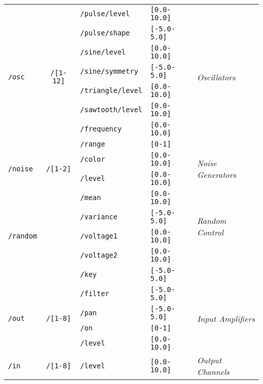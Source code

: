 \begin{table}
\begin{center}
\begin{tabular}{ l c l l l }
			\hline 
			\multirow{8}{*}{\texttt{/osc}}	& \multirow{8}{*}{\texttt{/[1-12]}}	& \texttt{/pulse/level}	&\texttt{[0.0-10.0]} & \multirow{8}{*}{\textit{Oscillators}}\\
			& & \texttt{/pulse/shape} & \texttt{[-5.0-5.0]} & \\
			& & \texttt{/sine/level} & \texttt{[0.0-10.0]} & \\
			& & \texttt{/sine/symmetry} & \texttt{[-5.0-5.0]} &\\
			& & \texttt{/triangle/level} & \texttt{[0.0-10.0]}  &\\
			& & \texttt{/sawtooth/level} & \texttt{[0.0-10.0]} &\\
			& & \texttt{/frequency} & \texttt{[0.0-10.0]} &\\
			& & \texttt{/range} & \texttt{[0-1]} &\\
			
			\hline
			\multirow{2}{*}{\texttt{/noise}}	& \multirow{2}{*}{\texttt{/[1-2]}}	& \texttt{/color}	&\texttt{[0.0-10.0]} & \multirow{2}{*}{\textit{Noise Generators}}\\
			& & \texttt{/level} &\texttt{[0.0-10.0]}& \\
			\hline
			
			\hline
			\multirow{5}{*}{\texttt{/random}}	& 	& \texttt{/mean}	&\texttt{[0.0-10.0]} \\
			& & \texttt{/variance} &\texttt{[-5.0-5.0]}&  \multirow{2}{*}{\textit{Random Control}}\\
			& & \texttt{/voltage1} &\texttt{[0.0-10.0]}& \multirow{2}{*}{\textit{Voltage Generator}}\\
			& & \texttt{/voltage2} &\texttt{[0.0-10.0]}& \\
			& & \texttt{/key} &\texttt{[-5.0-5.0]}& \\
			\hline
			
			\multirow{4}{*}{\texttt{/out}}	& \multirow{4}{*}{\texttt{/[1-8]}}	& \texttt{/filter}	&\texttt{[-5.0-5.0]} & \multirow{4}{*}{\textit{Input Amplifiers}}\\
			& & \texttt{/pan} & \texttt{[-5.0-5.0]} & \\
			& & \texttt{/on} & \texttt{[0-1]} & \\
			& & \texttt{/level} & \texttt{[0.0-10.0]} &\\
			\hline
			
			\multirow{1}{*}{\texttt{/in}}	& \multirow{1}{*}{\texttt{/[1-8]}}	& \texttt{/level}	&\texttt{[0.0-10.0]} & \multirow{1}{*}{\textit{Output Channels}}\\
			\hline
			

\end{tabular}
\end{center}
\end{table}
